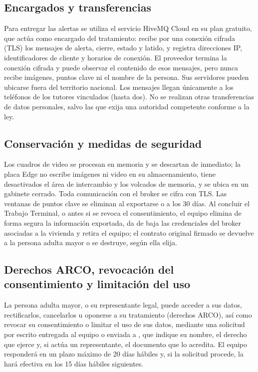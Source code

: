 \documentclass[12pt,a4paper,oneside]{book}
\theoremstyle{plain}
\theoremstyle{definition}
\theoremstyle{remark}
\begin{document}
\subsection{Encargados y transferencias}

Para entregar las alertas se utiliza el servicio HiveMQ Cloud en su plan gratuito, que actúa como encargado del tratamiento: recibe por una conexión cifrada (TLS) los mensajes de alerta, cierre, estado y latido, y registra direcciones IP, identificadores de cliente y horarios de conexión. El proveedor termina la conexión cifrada y puede observar el contenido de esos mensajes, pero nunca recibe imágenes, puntos clave ni el nombre de la persona. Sus servidores pueden ubicarse fuera del territorio nacional. Los mensajes llegan únicamente a los teléfonos de los tutores vinculados (hasta dos). No se realizan otras transferencias de datos personales, salvo las que exija una autoridad competente conforme a la ley.

\subsection{Conservación y medidas de seguridad}

Los cuadros de video se procesan en memoria y se descartan de inmediato; la placa Edge no escribe imágenes ni video en su almacenamiento, tiene desactivados el área de intercambio y los volcados de memoria, y se ubica en un gabinete cerrado. Toda comunicación con el broker se cifra con TLS. Las ventanas de puntos clave se eliminan al exportarse o a los 30 días. Al concluir el Trabajo Terminal, o antes si se revoca el consentimiento, el equipo elimina de forma segura la información exportada, da de baja las credenciales del broker asociadas a la vivienda y retira el equipo; el contrato original firmado se devuelve a la persona adulta mayor o se destruye, según ella elija.

\subsection{Derechos ARCO, revocación del consentimiento y limitación del uso}

La persona adulta mayor, o su representante legal, puede acceder a sus datos, rectificarlos, cancelarlos u oponerse a su tratamiento (derechos ARCO), así como revocar su consentimiento o limitar el uso de sus datos, mediante una solicitud por escrito entregada al equipo o enviada a \correoAviso, que indique su nombre, el derecho que ejerce y, si actúa un representante, el documento que lo acredita. El equipo responderá en un plazo máximo de 20 días hábiles y, si la solicitud procede, la hará efectiva en los 15 días hábiles siguientes.
\end{document}
